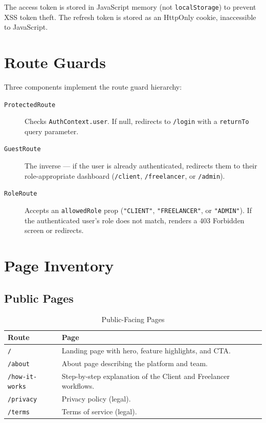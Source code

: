 The access token is stored in JavaScript memory (not \texttt{localStorage}) to prevent XSS token theft. The refresh token is stored as an HttpOnly cookie, inaccessible to JavaScript.

\section{Route Guards}

Three components implement the route guard hierarchy:

\begin{description}
  \item[\texttt{ProtectedRoute}] Checks \texttt{AuthContext.user}. If null, redirects to \texttt{/login} with a \texttt{returnTo} query parameter.
  \item[\texttt{GuestRoute}] The inverse --- if the user is already authenticated, redirects them to their role-appropriate dashboard (\texttt{/client}, \texttt{/freelancer}, or \texttt{/admin}).
  \item[\texttt{RoleRoute}] Accepts an \texttt{allowedRole} prop (\texttt{"CLIENT"}, \texttt{"FREELANCER"}, or \texttt{"ADMIN"}). If the authenticated user's role does not match, renders a 403 Forbidden screen or redirects.
\end{description}

\section{Page Inventory}

\subsection{Public Pages}

\begin{table}[H]
\centering
\caption{Public-Facing Pages}
\begin{tabularx}{\textwidth}{lX}
\toprule
\textbf{Route} & \textbf{Page} \\
\midrule
\texttt{/}              & Landing page with hero, feature highlights, and CTA. \\
\texttt{/about}         & About page describing the platform and team. \\
\texttt{/how-it-works}  & Step-by-step explanation of the Client and Freelancer workflows. \\
\texttt{/privacy}       & Privacy policy (legal). \\
\texttt{/terms}         & Terms of service (legal). \\
\bottomrule
\end{tabularx}
\end{table}

